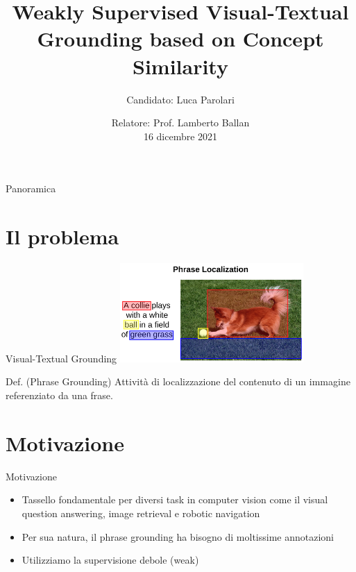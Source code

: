 \documentclass{beamer}
\title{Weakly Supervised Visual-Textual Grounding based on Concept Similarity}
\author{Candidato: Luca Parolari}
\date{Relatore: Prof. Lamberto Ballan \\ \vspace{0.2cm} \small 16 dicembre 2021}
\begin{document}
\maketitle

\begin{frame}{Panoramica}
  \tableofcontents
\end{frame}

\section{Il problema}

\begin{frame}{Visual-Textual Grounding}
  \centering
  \includegraphics[width=7cm]{images/dog-playing-with-ball.png}

  \vspace{0.5cm}

  \begin{alertblock}{Def. (Phrase Grounding)}
    Attività di localizzazione del contenuto di un immagine referenziato da una
    frase.
  \end{alertblock}
\end{frame}

\section{Motivazione}

\begin{frame}{Motivazione}
  \begin{itemize}
    \item Tassello fondamentale per diversi task in computer vision
    come il \alert{visual question answering}, \alert{image retrieval}
    e \alert{robotic navigation}
    \vspace{0.5cm}
    \item Per sua natura, il phrase grounding ha bisogno di
    \alert{moltissime annotazioni}
    \item Utilizziamo la \alert{supervisione debole} (weak)
  \end{itemize}
\end{frame}
\end{document}
